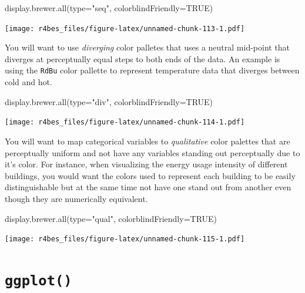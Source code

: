 \documentclass[
]{book}
\newenvironment{Shaded}{\begin{snugshade}}{\end{snugshade}}
\newcommand{\AttributeTok}[1]{\textcolor[rgb]{0.77,0.63,0.00}{#1}}
\newcommand{\ConstantTok}[1]{\textcolor[rgb]{0.00,0.00,0.00}{#1}}
\newcommand{\FunctionTok}[1]{\textcolor[rgb]{0.00,0.00,0.00}{#1}}
\newcommand{\NormalTok}[1]{#1}
\newcommand{\StringTok}[1]{\textcolor[rgb]{0.31,0.60,0.02}{#1}}
\begin{document}
\begin{Shaded}
\begin{Highlighting}[]
\FunctionTok{display.brewer.all}\NormalTok{(}\AttributeTok{type=}\StringTok{"seq"}\NormalTok{, }\AttributeTok{colorblindFriendly=}\ConstantTok{TRUE}\NormalTok{)}
\end{Highlighting}
\end{Shaded}

\texttt{[image: r4bes\_files/figure-latex/unnamed-chunk-113-1.pdf]}

You will want to use \emph{diverging} color palletes that uses a neutral mid-point that diverges at perceptually equal steps to both ends of the data. An example is using the \texttt{RdBu} color pallette to represent temperature data that diverges between cold and hot.

\begin{Shaded}
\begin{Highlighting}[]
\FunctionTok{display.brewer.all}\NormalTok{(}\AttributeTok{type=}\StringTok{"div"}\NormalTok{, }\AttributeTok{colorblindFriendly=}\ConstantTok{TRUE}\NormalTok{)}
\end{Highlighting}
\end{Shaded}

\texttt{[image: r4bes\_files/figure-latex/unnamed-chunk-114-1.pdf]}

You will want to map categorical variables to \emph{qualitative} color palettes that are perceptually uniform and not have any variables standing out perceptually due to it's color. For instance, when visualizing the energy usage intensity of different buildings, you would want the colors used to represent each building to be easily distinguishable but at the same time not have one stand out from another even though they are numerically equivalent.

\begin{Shaded}
\begin{Highlighting}[]
\FunctionTok{display.brewer.all}\NormalTok{(}\AttributeTok{type=}\StringTok{"qual"}\NormalTok{, }\AttributeTok{colorblindFriendly=}\ConstantTok{TRUE}\NormalTok{) }
\end{Highlighting}
\end{Shaded}

\texttt{[image: r4bes\_files/figure-latex/unnamed-chunk-115-1.pdf]}

\hypertarget{ggplot}{%
\section{\texorpdfstring{\texttt{ggplot()}}{ggplot()}}\label{ggplot}}
\end{document}
